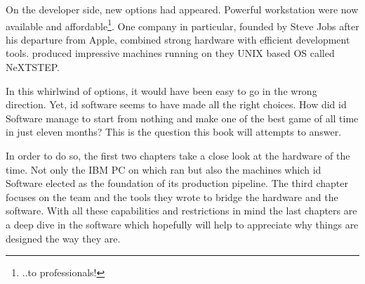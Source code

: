  \par
 On the developer side, new options had appeared. Powerful workstation were now available and affordable\footnote{..to professionals!}. One company in particular, founded by Steve Jobs after his departure from Apple, combined strong hardware with efficient development tools. \NeXT produced impressive machines running on they UNIX based OS called NeXTSTEP.\\%
 \par
 In this whirlwind of options, it would have been easy to go in the wrong direction. Yet, id software seems to have made all the right choices. How did id Software manage to start from nothing and make one of the best game of all time in just eleven months? This is the question this book will attempts to answer.\\
 \par
  In order to do so, the first two chapters take a close look at the hardware of the time. Not only the IBM PC on which \doom ran but also the \NeXT machines which id Software elected as the foundation of its production pipeline. The third chapter focuses on the team and the tools they wrote to bridge the hardware and the software. With all these capabilities and restrictions in mind the last chapters are a deep dive in the software which hopefully will help to appreciate why things are designed the way they are.\\



\vspace{3pt}

